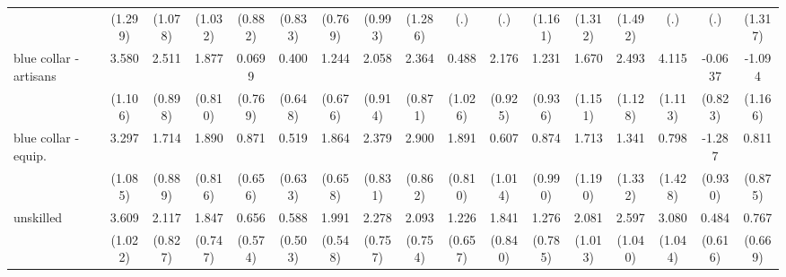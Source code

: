 {\begin{tabular}{l*{16}{c}}
                    &     (1.299)         &     (1.078)         &     (1.032)         &     (0.882)         &     (0.833)         &     (0.769)         &     (0.993)         &     (1.286)         &         (.)         &         (.)         &     (1.161)         &     (1.312)         &     (1.492)         &         (.)         &         (.)         &     (1.317)         \\
[1em]
blue collar - artisans&       3.580\sym{**} &       2.511\sym{**} &       1.877\sym{*}  &      0.0699         &       0.400         &       1.244         &       2.058\sym{*}  &       2.364\sym{**} &       0.488         &       2.176\sym{*}  &       1.231         &       1.670         &       2.493\sym{*}  &       4.115\sym{***}&     -0.0637         &      -1.094         \\
                    &     (1.106)         &     (0.898)         &     (0.810)         &     (0.769)         &     (0.648)         &     (0.676)         &     (0.914)         &     (0.871)         &     (1.026)         &     (0.925)         &     (0.936)         &     (1.151)         &     (1.128)         &     (1.113)         &     (0.823)         &     (1.166)         \\
[1em]
blue collar - equip.&       3.297\sym{**} &       1.714         &       1.890\sym{*}  &       0.871         &       0.519         &       1.864\sym{**} &       2.379\sym{**} &       2.900\sym{***}&       1.891\sym{*}  &       0.607         &       0.874         &       1.713         &       1.341         &       0.798         &      -1.287         &       0.811         \\
                    &     (1.085)         &     (0.889)         &     (0.816)         &     (0.656)         &     (0.633)         &     (0.658)         &     (0.831)         &     (0.862)         &     (0.810)         &     (1.014)         &     (0.990)         &     (1.190)         &     (1.332)         &     (1.428)         &     (0.930)         &     (0.875)         \\
[1em]
unskilled           &       3.609\sym{***}&       2.117\sym{*}  &       1.847\sym{*}  &       0.656         &       0.588         &       1.991\sym{***}&       2.278\sym{**} &       2.093\sym{**} &       1.226         &       1.841\sym{*}  &       1.276         &       2.081\sym{*}  &       2.597\sym{*}  &       3.080\sym{**} &       0.484         &       0.767         \\
                    &     (1.022)         &     (0.827)         &     (0.747)         &     (0.574)         &     (0.503)         &     (0.548)         &     (0.757)         &     (0.754)         &     (0.657)         &     (0.840)         &     (0.785)         &     (1.013)         &     (1.040)         &     (1.044)         &     (0.616)         &     (0.669)         \\

\end{tabular}}
